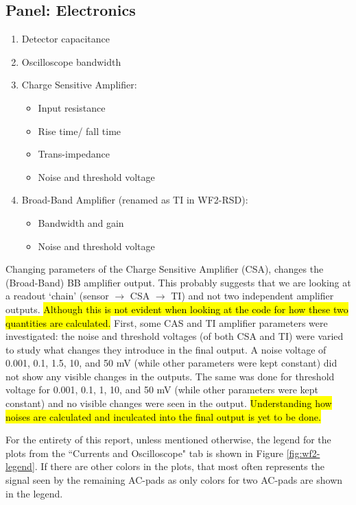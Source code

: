 \documentclass[11pt]{article}
\newcommand{\hlyellow}[1]{{\sethlcolor{yellow}\hl{#1}}}
\begin{document}
\subsection{Panel: Electronics}
\begin{enumerate}
    \item Detector capacitance
    \item Oscilloscope bandwidth
    \item Charge Sensitive Amplifier:
    \begin{itemize}
        \item Input resistance
        \item Rise time/ fall time
        \item Trans-impedance
        \item Noise and threshold voltage
    \end{itemize}
    \item Broad-Band Amplifier (renamed as TI in WF2-RSD):
    \begin{itemize}
        \item Bandwidth and gain
        \item Noise and threshold voltage
    \end{itemize}
\end{enumerate}
Changing parameters of the Charge Sensitive Amplifier (CSA), changes the (Broad-Band) BB amplifier output. This probably suggests that we are looking at a readout `chain' (sensor $\rightarrow$ CSA $\rightarrow$ TI) and not two independent amplifier outputs. \hlyellow{Although this is not evident when looking at the code for how these two quantities are calculated.}
\newline
First, some CAS and TI amplifier parameters were investigated: the noise and threshold voltages (of both CSA and TI) were varied to study what changes they introduce in the final output. A noise voltage of 0.001, 0.1, 1.5, 10, and 50 mV (while other parameters were kept constant) did not show any visible changes in the outputs. The same was done for threshold voltage for 0.001, 0.1, 1, 10, and 50 mV (while other parameters were kept constant) and no visible changes were seen in the output. \hlyellow{Understanding how noises are calculated and inculcated into the final output is yet to be done.}

For the entirety of this report, unless mentioned otherwise, the legend for the plots from the ``Currents and Oscilloscope" tab is shown in Figure \ref{fig:wf2-legend}. If there are other colors in the plots, that most often represents the signal seen by the remaining AC-pads as only colors for two AC-pads are shown in the legend.
\end{document}
